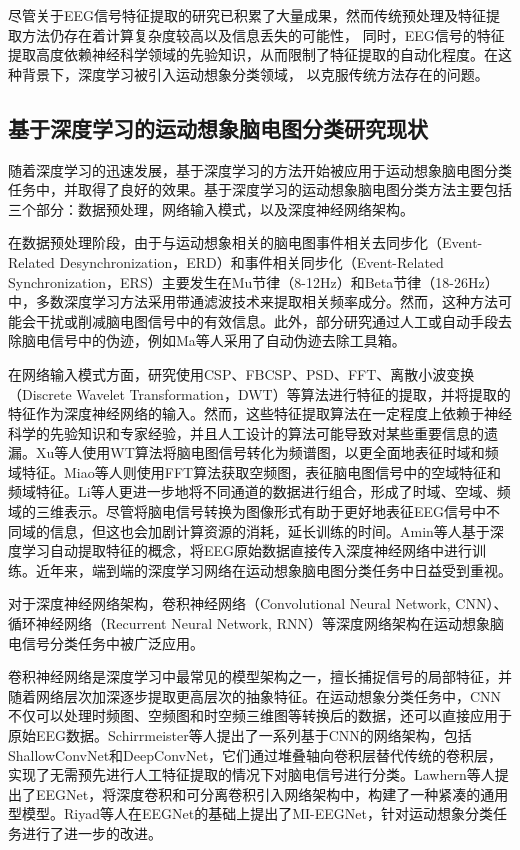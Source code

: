 尽管关于EEG信号特征提取的研究已积累了大量成果，然而传统预处理及特征提取方法仍存在着计算复杂度较高以及信息丢失的可能性，
同时，EEG信号的特征提取高度依赖神经科学领域的先验知识，从而限制了特征提取的自动化程度\cite{altaheri2023deep}。在这种背景下，深度学习被引入运动想象分类领域，
以克服传统方法存在的问题。

\subsection{基于深度学习的运动想象脑电图分类研究现状}

随着深度学习的迅速发展，基于深度学习的方法开始被应用于运动想象脑电图分类任务中，并取得了良好的效果。基于深度学习的运动想象脑电图分类方法主要包括三个部分：数据预处理，网络输入模式，以及深度神经网络架构。

在数据预处理阶段，由于与运动想象相关的脑电图事件相关去同步化（Event-Related Desynchronization，ERD）和事件相关同步化（Event-Related Synchronization，ERS）主要发生在Mu节律（8-12Hz）和Beta节律（18-26Hz）中\cite{altaheri2023deep}，多数深度学习方法采用带通滤波技术来提取相关频率成分。然而，这种方法可能会干扰或削减脑电图信号中的有效信息。此外，部分研究通过人工或自动手段去除脑电信号中的伪迹，例如Ma等人\cite{ma2019deep}采用了自动伪迹去除工具箱\cite{gomez2006automatic}。

在网络输入模式方面，研究\cite{luo2018exploring,olivas2019classification,she2019hierarchical,ma2020dwt,chu2018decoding,hassanpour2019novel}使用CSP、FBCSP、PSD、FFT、离散小波变换（Discrete Wavelet Transformation，DWT）等算法进行特征的提取，并将提取的特征作为深度神经网络的输入。然而，这些特征提取算法在一定程度上依赖于神经科学的先验知识和专家经验，并且人工设计的算法可能导致对某些重要信息的遗漏。Xu等人\cite{xu2018wavelet}使用WT算法将脑电图信号转化为频谱图，以更全面地表征时域和频域特征。Miao等人\cite{miao2020spatial}则使用FFT算法获取空频图，表征脑电图信号中的空域特征和频域特征。Li等人\cite{li2020novel}更进一步地将不同通道的数据进行组合，形成了时域、空域、频域的三维表示。尽管将脑电信号转换为图像形式有助于更好地表征EEG信号中不同域的信息，但这也会加剧计算资源的消耗，延长训练的时间。Amin\cite{amin2019deep}等人基于深度学习自动提取特征的概念，将EEG原始数据直接传入深度神经网络中进行训练。近年来，端到端的深度学习网络在运动想象脑电图分类任务中日益受到重视。

对于深度神经网络架构，卷积神经网络（Convolutional Neural Network, CNN）、循环神经网络（Recurrent Neural Network, RNN）等深度网络架构在运动想象脑电信号分类任务中被广泛应用。

卷积神经网络是深度学习中最常见的模型架构之一，擅长捕捉信号的局部特征，并随着网络层次加深逐步提取更高层次的抽象特征。在运动想象分类任务中，CNN不仅可以处理时频图、空频图和时空频三维图等转换后的数据，还可以直接应用于原始EEG数据。Schirrmeister等人\cite{schirrmeister2017deep}提出了一系列基于CNN的网络架构，包括ShallowConvNet和DeepConvNet，它们通过堆叠轴向卷积层替代传统的卷积层，实现了无需预先进行人工特征提取的情况下对脑电信号进行分类。Lawhern等人\cite{lawhern2018eegnet}提出了EEGNet，将深度卷积和可分离卷积引入网络架构中，构建了一种紧凑的通用型模型。Riyad等人\cite{riyad2021mi}在EEGNet的基础上提出了MI-EEGNet，针对运动想象分类任务进行了进一步的改进。


